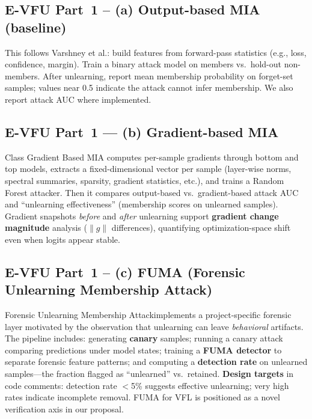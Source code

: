\documentclass[sigconf,nonacm]{acmart}
\begin{document}
\subsection{E-VFU Part~1 -- (a) Output-based MIA (baseline)}
This follows Varshney et al.: build features from forward-pass statistics (e.g., loss, confidence, margin). Train a binary attack model on members vs.\ hold-out non-members. After unlearning, report mean membership probability on forget-set samples; values near 0.5 indicate the attack cannot infer membership. We also report attack AUC where implemented.

\subsection{E-VFU Part~1 --- (b) Gradient-based MIA}
Class Gradient Based MIA computes per-sample gradients through bottom and top models, extracts a fixed-dimensional vector per sample (layer-wise norms, spectral summaries, sparsity, gradient statistics, etc.), and trains a Random Forest attacker. Then it compares output-based vs.\ gradient-based attack AUC and ``unlearning effectiveness'' (membership scores on unlearned samples). Gradient snapshots \emph{before} and \emph{after} unlearning support \textbf{gradient change magnitude} analysis ($\|g\|$ differences), quantifying optimization-space shift even when logits appear stable.

\subsection{E-VFU Part~1 -- (c) FUMA (Forensic Unlearning Membership Attack)}
Forensic Unlearning Membership Attackimplements a project-specific forensic layer motivated by the observation that unlearning can leave \emph{behavioral} artifacts. The pipeline includes: generating \textbf{canary} samples; running a canary attack comparing predictions under model states; training a \textbf{FUMA detector} to separate forensic feature patterns; and computing a \textbf{detection rate} on unlearned samples---the fraction flagged as ``unlearned'' vs.\ retained. \textbf{Design targets} in code comments: detection rate $<$5\% suggests effective unlearning; very high rates indicate incomplete removal. FUMA for VFL is positioned as a novel verification axis in our proposal.
\end{document}
